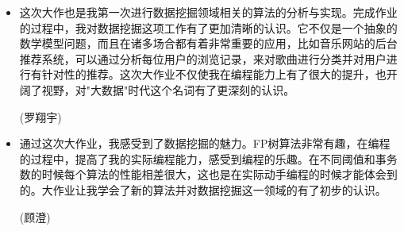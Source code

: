 \documentclass[a4paper,9pt]{article}
\begin{document}
\begin{itemize}
	\item{} 这次大作也是我第一次进行数据挖掘领域相关的算法的分析与实现。完成作业的过程中，我对数据挖掘这项工作有了更加清晰的认识。它不仅是一个抽象的数学模型问题，而且在诸多场合都有着非常重要的应用，比如音乐网站的后台推荐系统，可以通过分析每位用户的浏览记录，来对歌曲进行分类并对用户进行有针对性的推荐。这次大作业不仅使我在编程能力上有了很大的提升，也开阔了视野，对"大数据"时代这个名词有了更深刻的认识。

		(罗翔宇)
	\item {} 通过这次大作业，我感受到了数据挖掘的魅力。FP树算法非常有趣，在编程的过程中，提高了我的实际编程能力，感受到编程的乐趣。在不同阈值和事务数的时候每个算法的性能相差很大，这也是在实际动手编程的时候才能体会到的。大作业让我学会了新的算法并对数据挖掘这一领域的有了初步的认识。

		(顾澄)
\end{itemize}
\end{document}
